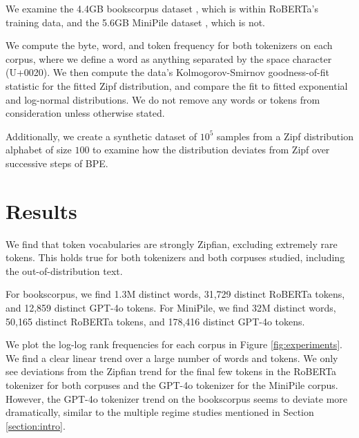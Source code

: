 \documentclass[11pt]{article}
\begin{document}
We examine the 4.4GB bookscorpus dataset \cite{zhu2015aligningbooksmoviesstorylike}, which is within RoBERTa's training data, and the 5.6GB MiniPile dataset \cite{kaddour2023minipilechallengedataefficientlanguage}, which is not.

We compute the byte, word, and token frequency for both tokenizers on each corpus, where we define a word as anything separated by the space character (U+0020). We then compute the data's Kolmogorov-Smirnov goodness-of-fit statistic for the fitted Zipf distribution, and compare the fit to fitted exponential and log-normal distributions. We do not remove any words or tokens from consideration unless otherwise stated.

Additionally, we create a synthetic dataset of $10^5$ samples from a Zipf distribution alphabet of size $100$ to examine how the distribution deviates from Zipf over successive steps of BPE. 

\section{Results}

We find that token vocabularies are strongly Zipfian, excluding extremely rare tokens. This holds true for both tokenizers and both corpuses studied, including the out-of-distribution text. 

For bookscorpus, we find 1.3M distinct words, 31,729 distinct RoBERTa tokens, and 12,859 distinct GPT-4o tokens. For MiniPile, we find 32M distinct words, 50,165 distinct RoBERTa tokens, and 178,416 distinct GPT-4o tokens. 

We plot the log-log rank frequencies for each corpus in Figure \ref{fig:experiments}. We find a clear linear trend over a large number of words and tokens. We only see deviations from the Zipfian trend for the final few tokens in the RoBERTa tokenizer for both corpuses and the GPT-4o tokenizer for the MiniPile corpus. However, the GPT-4o tokenizer trend on the bookscorpus seems to deviate more dramatically, similar to the multiple regime studies mentioned in Section \ref{section:intro}.
\end{document}
